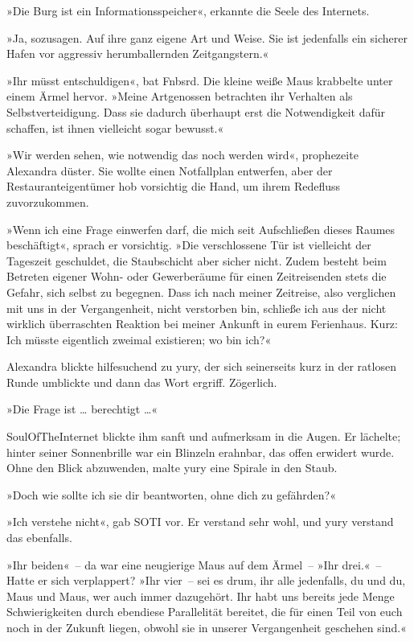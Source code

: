 »Die Burg ist ein Informationsspeicher«, erkannte die Seele des Internets.

»Ja, sozusagen. Auf ihre ganz eigene Art und Weise. Sie ist jedenfalls ein sicherer Hafen vor aggressiv herumballernden Zeitgangstern.«

»Ihr müsst entschuldigen«, bat Fnbsrd. Die kleine weiße Maus krabbelte unter einem Ärmel hervor. »Meine Artgenossen betrachten ihr Verhalten als Selbstverteidigung. Dass sie dadurch überhaupt erst die Notwendigkeit dafür schaffen, ist ihnen vielleicht sogar bewusst.«

»Wir werden sehen, wie notwendig das noch werden wird«, prophezeite Alexandra düster. Sie wollte einen Notfallplan entwerfen, aber der Restauranteigentümer hob vorsichtig die Hand, um ihrem Redefluss zuvorzukommen.

»Wenn ich eine Frage einwerfen darf, die mich seit Aufschließen dieses Raumes beschäftigt«, sprach er vorsichtig. »Die verschlossene Tür ist vielleicht der Tageszeit geschuldet, die Staubschicht aber sicher nicht. Zudem besteht beim Betreten eigener Wohn- oder Gewerberäume für einen Zeitreisenden stets die Gefahr, sich selbst zu begegnen. Dass ich nach meiner Zeitreise, also verglichen mit uns in der Vergangenheit, nicht verstorben bin, schließe ich aus der nicht wirklich überraschten Reaktion bei meiner Ankunft in eurem Ferienhaus. Kurz: Ich müsste eigentlich zweimal existieren; wo bin ich?«

Alexandra blickte hilfesuchend zu yury, der sich seinerseits kurz in der ratlosen Runde umblickte und dann das Wort ergriff. Zögerlich.

»Die Frage ist … berechtigt …«

SoulOfTheInternet blickte ihm sanft und aufmerksam in die Augen. Er lächelte; hinter seiner Sonnenbrille war ein Blinzeln erahnbar, das offen erwidert wurde. Ohne den Blick abzuwenden, malte yury eine Spirale in den Staub.

»Doch wie sollte ich sie dir beantworten, ohne dich zu gefährden?«

»Ich verstehe nicht«, gab SOTI vor. Er verstand sehr wohl, und yury verstand das ebenfalls.

»Ihr beiden«~– da war eine neugierige Maus auf dem Ärmel~– »Ihr drei.«~– Hatte er sich verplappert? »Ihr vier~– sei es drum, ihr alle jedenfalls, du und du, Maus und Maus, wer auch immer dazugehört. Ihr habt uns bereits jede Menge Schwierigkeiten durch ebendiese Parallelität bereitet, die für einen Teil von euch noch in der Zukunft liegen, obwohl sie in unserer Vergangenheit geschehen sind.«

